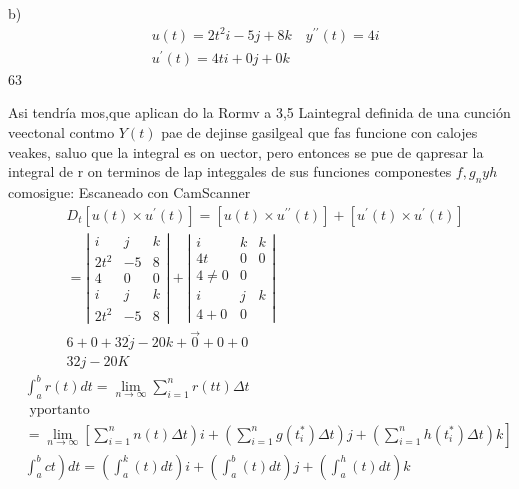 

b)
$$
\begin{aligned}
	& u(t)=2 t^2 i-5 j+8 k \quad y^{\prime \prime}(t)=4 i \\
	& u^{\prime}(t)=4 t i+0 j+0 k
\end{aligned}
$$
63

Asi tendría mos,que aplican do la
Rormv a
3,5 Laintegral definida de una cunción veectonal contmo $Y(t)$ pae de dejinse gasilgeal que fas funcione con calojes veakes, saluo que la integral es on uector, pero entonces se pue de qapresar la integral de r on terminos de lap integgales de sus funciones componestes $f, g_n y h$ comosigue:
Escaneado con CamScanner
$$
\begin{aligned}
	& D_t\left[u(t) \times u^{\prime}(t)\right]=\left[u(t) \times u^{\prime \prime}(t)\right]+\left[u^{\prime}(t) \times u^{\prime}(t)\right] \\
	& =\left|\begin{array}{ccc}
		i & j & k \\
		2 t^2 & -5 & 8 \\
		4 & 0 & 0 \\
		i & j & k \\
		2 t^2 & -5 & 8
	\end{array}\right|+\left|\begin{array}{ccc}
		i & k & k \\
		4 t & 0 & 0 \\
		4 \neq 0 & 0 \\
		i & j & k \\
		4+0 & 0
	\end{array}\right| \\
	& 6+0+32 \dot{j}-20 k+\overrightarrow{0}+0+0 \\
	& 32 j-20 K
\end{aligned}
$$
$$
\begin{aligned}
	& \int_a^b r(t) d t=\lim _{n \rightarrow \infty} \sum_{i=1}^n r(t t) \Delta t \\
	& \text { yportanto } \\
	& \left.=\lim _{n \rightarrow \infty}\left[\sum_{i=1}^n n(t) \Delta t\right) i+\left(\sum_{i=1}^n g\left(t_i^*\right) \Delta t\right) j+\left(\sum_{i=1}^n h\left(t_i^*\right) \Delta t\right) k\right] \\
	& \left.\int_a^b c t\right) d t=\left(\int_a^k(t) d t\right) i+\left(\int_a^b(t) d t\right) j+\left(\int_a^h(t) d t\right) k
\end{aligned}
$$


